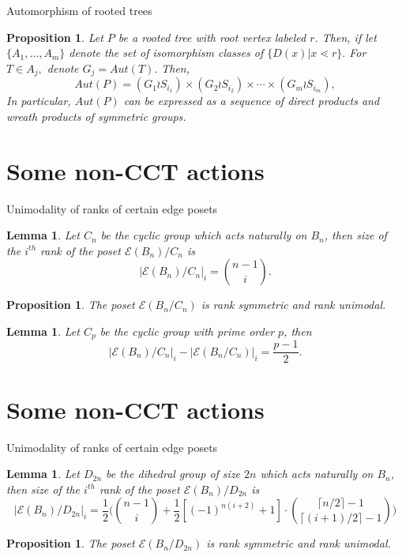 \documentclass{beamer}
\newtheorem{lem}[thm]{Lemma}
\newtheorem{prop}[thm]{Proposition}
\theoremstyle{remark}
\begin{document}
\begin{frame}{Automorphism of rooted trees}
\begin{prop}
Let $P$ be a rooted tree with root vertex labeled $r$. Then, if let $\{A_1,\ldots,A_m\}$ denote the set of isomorphism classes of $\{D(x)|x\lessdot r\}.$ For $T \in A_j,$ denote $G_j = Aut(T).$ Then, 
$$Aut(P) = (G_1 \wr S_{i_1}) \times (G_2 \wr S_{i_2}) \times \cdots \times (G_m\wr S_{i_m}),$$
In particular, $Aut(P)$ can be expressed as a sequence of direct products and wreath products of symmetric groups.
\end{prop}
\end{frame}





\section{Some non-CCT actions}
\begin{frame}{Unimodality of ranks of certain edge posets}
\begin{lem}
Let $C_n$ be the cyclic group which acts naturally on $B_n$, then size of the $i^{th}$ rank of the poset $\mathcal E (B_n)/C_n$ is $$|\mathcal E (B_n)/C_n|_{i} = \binom{n-1}{i}.$$
\end{lem}
\pause
\begin{prop}
The poset $\mathcal E (B_n/C_n)$ is rank symmetric and rank unimodal.
\end{prop}
\pause
\begin{lem}
Let $C_p$ be the cyclic group with prime order $p$, then  $$|\mathcal E (B_n)/C_n|_{i} - |\mathcal E(B_n/C_n)|_i = \frac{p-1}{2}.$$
\end{lem}
\end{frame}





\section{Some non-CCT actions}
\begin{frame}{Unimodality of ranks of certain edge posets}
\begin{lem}
Let $D_{2n}$ be the dihedral group of size $2n$ which acts naturally on $B_n$, then size of the $i^{th}$ rank of the poset $\mathcal E (B_n)/D_{2n}$ is
$$|\mathcal E (B_n)/D_{2n}|_{i}  = \frac{1}{2} \Big( {n-1 \choose i } + \frac{1}{2} [(-1)^{n(i+2)}+1] \cdot { \lceil n/2\rceil -1  \choose \lceil (i+1)/2 \rceil - 1}  \Big)$$
\end{lem}
\pause
\begin{prop}
The poset $\mathcal E (B_n/D_{2n})$ is rank symmetric and rank unimodal.
\end{prop}
\end{frame}
\end{document}
